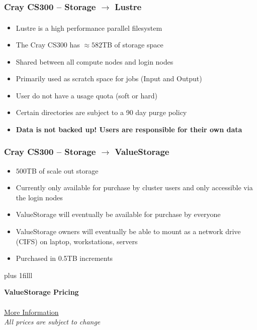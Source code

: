 \documentclass[t,hyperref={pdfpagelabels=false}]{beamer}
\newcommand{\regtrademark}{\fontsize{5}{6}\selectfont \textsuperscript{\textregistered}}
\newcommand{\btVFill}{\vskip0pt plus 1filll}
\newcommand{\lustre}{Lustre{\regtrademark}}
\begin{document}
\begin{frame}
	\frametitle{Cray CS300 -- Storage $\rightarrow$ {\lustre}}
	\begin{itemize}
		\item {\lustre} is a high performance parallel filesystem
		\item The Cray CS300 has $\approx582$TB of storage space
		\item Shared between all compute nodes and login nodes
		\item Primarily used as scratch space for jobs (Input and Output)
		\item User do not have a usage quota (soft or hard)
		\item Certain directories are subject to a 90 day purge policy
		\item \textbf{Data is not backed up!  Users are responsible for their own data}
	\end{itemize}
\end{frame}


\begin{frame}
	\frametitle{Cray CS300 -- Storage $\rightarrow$ ValueStorage}
	\begin{itemize}
		\item $500$TB of scale out storage
		\item Currently only available for purchase by cluster users and only accessible via the login nodes
		\item ValueStorage will eventually be available for purchase by everyone
		\item ValueStorage owners will eventually be able to mount as a network drive (CIFS) on laptop, workstations, servers
		\item Purchased in 0.5TB increments
	\end{itemize}
	\btVFill

	\begin{center}
	\textbf{ValueStorage Pricing}~\\ 
		~\\ \href{http://www.hawaii.edu/its/value-storage-pricing/}{More Information}
		~\\	{\footnotesize \emph{All prices are subject to change}}
	\end{center}
\end{frame}
\end{document}
